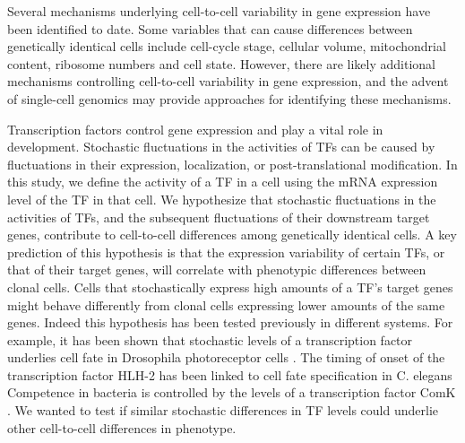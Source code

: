 Several mechanisms underlying cell-to-cell variability in gene expression have been identified to date. Some variables that can cause differences between genetically identical cells include cell-cycle stage\cite{Zopf2013-ua}, cellular volume\cite{Kempe2015-xy,Padovan-Merhar2015-cx}, mitochondrial content\cite{Neves2010-vn}, ribosome numbers \cite{Guido2007-rf} and cell state\cite{Topolewski2022-bw,Kiviet2014-vj,Iwamoto2016-wf}. However, there are likely additional mechanisms controlling cell-to-cell variability in gene expression, and the advent of single-cell genomics\cite{Trapnell2015-zd,Eling2019-cr} may provide approaches for identifying these mechanisms.
 
Transcription factors control gene expression and play a vital role in development. Stochastic fluctuations in the activities of TFs can be caused by fluctuations in their expression, localization, or post-translational modification. In this study, we define the activity of a TF in a cell using the mRNA expression level of the TF in that cell. We hypothesize that stochastic fluctuations in the activities of TFs, and the subsequent fluctuations of their downstream target genes, contribute to cell-to-cell differences among genetically identical cells. A key prediction of this hypothesis is that the expression variability of certain TFs, or that of their target genes, will correlate with phenotypic differences between clonal cells. Cells that stochastically express high amounts of a TF’s target genes might behave differently from clonal cells expressing lower amounts of the same genes. Indeed this hypothesis has been tested previously in different systems. For example, it has been shown that stochastic levels of a transcription factor underlies cell fate in Drosophila photoreceptor cells \cite{Wernet2006-rg}. The timing of onset of the transcription factor HLH-2 has been linked to cell fate specification in C. elegans \cite{Attner2019-lh} Competence in bacteria is controlled by the levels of a transcription factor ComK \cite{Samoilov2006-gh}\cite{Suel2006-pw}.  We wanted to test if similar stochastic differences in TF levels could underlie other cell-to-cell differences in phenotype.

